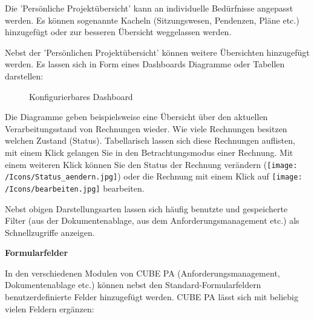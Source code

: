 Die 'Persönliche Projektübersicht' kann an individuelle Bedürfnisse angepasst werden. Es können sogenannte Kacheln (Sitzungswesen, Pendenzen, Pläne etc.) hinzugefügt oder zur besseren Übersicht weggelassen werden.

\vspace{\baselineskip}

Nebst der 'Persönlichen Projektübersicht' können weitere Übersichten hinzugefügt werden. Es lassen sich in Form eines Dashboards Diagramme oder Tabellen darstellen:

\begin{figure}[H]
\caption{Konfigurierbares Dashboard}
\end{figure}

Die Diagramme geben beispielsweise eine Übersicht über den aktuellen Verarbeitungsstand von Rechnungen wieder. Wie viele Rechnungen besitzen welchen Zustand (Status). Tabellarisch lassen sich diese Rechnungen auflisten, mit einem Klick gelangen Sie in den Betrachtungsmodus einer Rechnung. Mit einem weiteren Klick können Sie den Status der Rechnung verändern (\texttt{[image: /Icons/Status\_aendern.jpg]}) oder die Rechnung mit einem Klick auf \texttt{[image: /Icons/bearbeiten.jpg]} bearbeiten.

\vspace{\baselineskip}

Nebst obigen Darstellungsarten lassen sich häufig benutzte und gespeicherte Filter (aus der Dokumentenablage, aus dem Anforderungsmanagement etc.) als Schnellzugriffe anzeigen. 

\vspace{\baselineskip}

\pagebreak
\textbf{Formularfelder}

\vspace{\baselineskip}

In den verschiedenen Modulen von CUBE PA (Anforderungsmanagement, Dokumentenablage etc.) können nebst den Standard-Formularfeldern benutzerdefinierte Felder hinzugefügt werden. CUBE PA lässt sich mit beliebig vielen Feldern ergänzen:

\vspace{\baselineskip}

